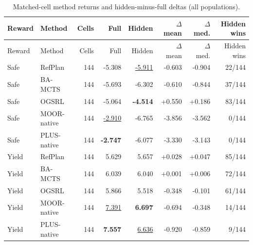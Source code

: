 \begin{longtable}{llrrrrrr}
\caption{Matched-cell method returns and hidden-minus-full deltas (all populations).}\label{tab:matched-methods}\\
\toprule
Reward & Method & Cells & Full & Hidden & $\Delta$ mean & $\Delta$ med. & Hidden wins \\
\midrule
\endfirsthead
\toprule
Reward & Method & Cells & Full & Hidden & $\Delta$ mean & $\Delta$ med. & Hidden wins \\
\midrule
\endhead
Safe & RefPlan & 144 & -5.308 & \underline{-5.911} & -0.603 & -0.904 & 22/144 \\
Safe & BA-MCTS & 144 & -5.693 & -6.302 & -0.610 & -0.844 & 37/144 \\
Safe & OGSRL & 144 & -5.064 & \textbf{-4.514} & +0.550 & +0.186 & 83/144 \\
Safe & MOOR-native & 144 & \underline{-2.910} & -6.765 & -3.856 & -3.562 & 0/144 \\
Safe & PLUS-native & 144 & \textbf{-2.747} & -6.077 & -3.330 & -3.143 & 0/144 \\
Yield & RefPlan & 144 & 5.629 & 5.657 & +0.028 & +0.047 & 85/144 \\
Yield & BA-MCTS & 144 & 6.039 & 6.040 & +0.001 & +0.006 & 72/144 \\
Yield & OGSRL & 144 & 5.866 & 5.518 & -0.348 & -0.101 & 61/144 \\
Yield & MOOR-native & 144 & \underline{7.391} & \textbf{6.697} & -0.694 & -0.348 & 14/144 \\
Yield & PLUS-native & 144 & \textbf{7.557} & \underline{6.636} & -0.920 & -0.859 & 9/144 \\
\bottomrule
\end{longtable}
